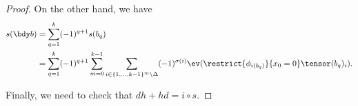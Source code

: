 \begin{proof}
On the other hand, we have
\begin{align*}
s(\bdy b) & = \sum_{q=1}^k (-1)^{q+1} s(b_q) \\
	       & = \sum_{q=1}^k (-1)^{q+1} \sum_{m=0}^{k-1} \sum_{i \in \{1, \ldots, k-1\}^{m} \setminus \Delta} (-1)^{\sigma(i)}  \ev(\restrict{\phi_{i(b_q)}}{x_0 = 0} \tensor (b_q)_i).
\end{align*}

Finally, we need to check that $dh+hd=i\circ s$. \todo{}
\end{proof}
